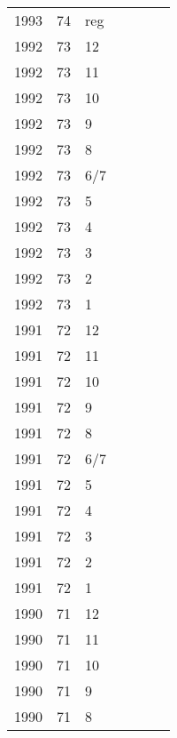 \begin{longtable}{ |l|l|l|l|p{2.7cm}|l|p{2cm}| }
 1993 & 74 &   reg &         &                &  & \\
 1992 & 73 &    12 &         &                &  & \\
 1992 & 73 &    11 &         &                &  & \\
 1992 & 73 &    10 &         &                &  & \\
 1992 & 73 &     9 &         &                &  & \\
 1992 & 73 &     8 &         &                &  & \\
 1992 & 73 &   6/7 &         &                &  & \\
 1992 & 73 &     5 &         &                &  & \\
 1992 & 73 &     4 &         &                &  & \\
 1992 & 73 &     3 &         &                &  & \\
 1992 & 73 &     2 &         &                &  & \\
 1992 & 73 &     1 &         &                &  & \\
 1991 & 72 &    12 &         &                &  & \\
 1991 & 72 &    11 &         &                &  & \\
 1991 & 72 &    10 &         &                &  & \\
 1991 & 72 &     9 &         &                &  & \\
 1991 & 72 &     8 &         &                &  & \\
 1991 & 72 &   6/7 &         &                &  & \\
 1991 & 72 &     5 &         &                &  & \\
 1991 & 72 &     4 &         &                &  & \\
 1991 & 72 &     3 &         &                &  & \\
 1991 & 72 &     2 &         &                &  & \\
 1991 & 72 &     1 &         &                &  & \\
 1990 & 71 &    12 &         &                &  & \\
 1990 & 71 &    11 &         &                &  & \\
 1990 & 71 &    10 &         &                &  & \\
 1990 & 71 &     9 &         &                &  & \\
 1990 & 71 &     8 &         &                &  & \\

\end{longtable}
